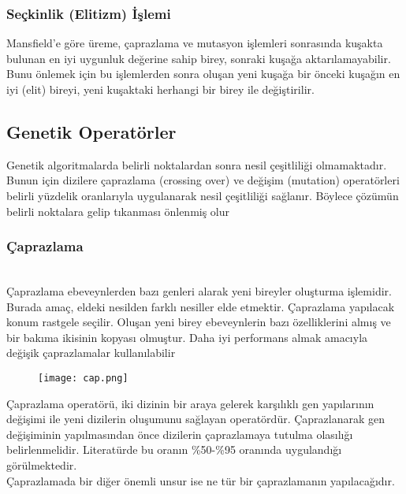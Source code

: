 \documentclass[12pt, a4paper]{article}
\begin{document}
\begin{flushleft}
	\subsubsection{Seçkinlik (Elitizm) İşlemi}
	Mansfield’e göre üreme, çaprazlama ve mutasyon işlemleri sonrasında 
	kuşakta bulunan en iyi uygunluk değerine sahip birey, sonraki kuşağa 
	aktarılamayabilir. Bunu önlemek için bu işlemlerden sonra oluşan yeni kuşağa bir 
	önceki kuşağın en iyi (elit) bireyi, yeni kuşaktaki herhangi bir birey ile değiştirilir. 
	
	
	\newpage
	\subsection{ Genetik Operatörler}
	Genetik algoritmalarda belirli noktalardan sonra nesil çeşitliliği 
	olmamaktadır. Bunun için dizilere çaprazlama (crossing over) ve değişim (mutation) 
	operatörleri belirli yüzdelik oranlarıyla uygulanarak nesil çeşitliliği sağlanır. Böylece 
	çözümün belirli noktalara gelip tıkanması önlenmiş olur\\[5pt]
	
	\subsubsection{ Çaprazlama}\cite{birougul2005genetik} \\[5pt]	
	
	Çaprazlama ebeveynlerden bazı genleri alarak yeni bireyler oluşturma 
	işlemidir. Burada amaç, eldeki nesilden farklı nesiller elde etmektir. Çaprazlama
	yapılacak konum rastgele seçilir. Oluşan yeni birey ebeveynlerin bazı özelliklerini 
	almış ve bir bakıma ikisinin kopyası olmuştur. Daha iyi performans almak amacıyla 
	değişik çaprazlamalar kullanılabilir\\[5pt]
	
	
	\begin{figure}[h]
		
		\centering
		\texttt{[image: cap.png]}
		\\[20pt]
	\end{figure}
	
	Çaprazlama operatörü, iki dizinin bir araya gelerek karşılıklı gen yapılarının 
	değişimi ile yeni dizilerin oluşumunu sağlayan operatördür. Çaprazlanarak gen 
	değişiminin yapılmasından önce dizilerin çaprazlamaya tutulma olasılığı 
	belirlenmelidir. Literatürde bu oranın \%50-\%95 oranında uygulandığı görülmektedir.\\[5pt]
	Çaprazlamada bir diğer önemli unsur ise ne tür bir 
	çaprazlamanın yapılacağıdır.
	

\end{flushleft}
\end{document}
